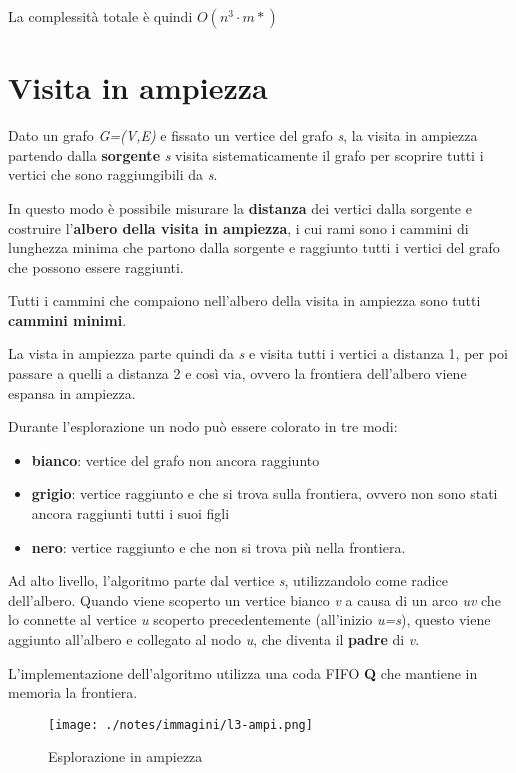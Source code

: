 La complessità totale è quindi $O(n^3 \cdot m*)$

\section{Visita in ampiezza}\label{visita-in-ampiezza}

Dato un grafo \emph{G=(V,E)} e fissato un vertice del grafo \emph{s}, la
visita in ampiezza partendo dalla \textbf{sorgente} \emph{s} visita
sistematicamente il grafo per scoprire tutti i vertici che sono
raggiungibili da \emph{s}.

In questo modo è possibile misurare la \textbf{distanza} dei vertici
dalla sorgente e costruire l'\textbf{albero della visita in ampiezza}, i
cui rami sono i cammini di lunghezza minima che partono dalla sorgente e
raggiunto tutti i vertici del grafo che possono essere raggiunti.

Tutti i cammini che compaiono nell'albero della visita in ampiezza sono
tutti \textbf{cammini minimi}.

La vista in ampiezza parte quindi da \emph{s} e visita tutti i vertici a
distanza 1, per poi passare a quelli a distanza 2 e così via, ovvero la
frontiera dell'albero viene espansa in ampiezza.

Durante l'esplorazione un nodo può essere colorato in tre modi:

\begin{itemize}
\item
  \textbf{bianco}: vertice del grafo non ancora raggiunto
\item
  \textbf{grigio}: vertice raggiunto e che si trova sulla frontiera,
  ovvero non sono stati ancora raggiunti tutti i suoi figli
\item
  \textbf{nero}: vertice raggiunto e che non si trova più nella
  frontiera.
\end{itemize}

Ad alto livello, l'algoritmo parte dal vertice \emph{s}, utilizzandolo
come radice dell'albero. Quando viene scoperto un vertice bianco
\emph{v} a causa di un arco \emph{uv} che lo connette al vertice \emph{u}
scoperto precedentemente (all'inizio \emph{u=s}), questo viene aggiunto
all'albero e collegato al nodo \emph{u}, che diventa il \textbf{padre}
di \emph{v}.

L'implementazione dell'algoritmo utilizza una coda FIFO \textbf{Q} che
mantiene in memoria la frontiera.

\begin{figure}[htbp]
\centering
\texttt{[image: ./notes/immagini/l3-ampi.png]}
\caption{Esplorazione in ampiezza}
\end{figure}

